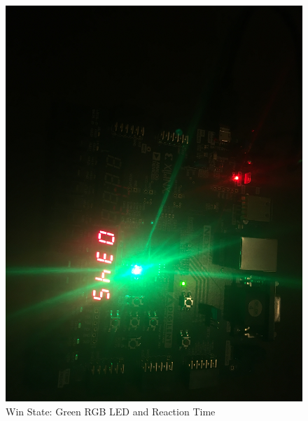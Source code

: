 \documentclass{article}
\begin{document}
\begin{center}
	\begin{figure}
		\includegraphics[width=.9\linewidth]{Win.JPG}
		\caption{Win State: Green RGB LED and Reaction Time}
		\label{fig:WinImg}
	\end{figure}


\end{center}
\end{document}
